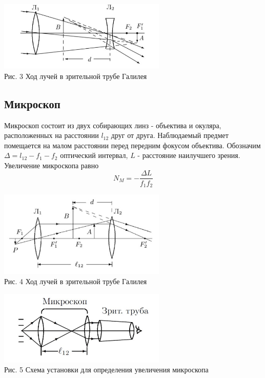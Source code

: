 \documentclass[14pt,a4paper]{scrartcl}
\begin{document}
\begin{center}
  \includegraphics[width = 8cm]{ход лучей в гал.jpg}\\
  Рис. 3 Ход лучей в зрительной трубе Галилея
 
\end{center}


\subsection{Микроскоп}
Микроскоп состоит из двух собирающих линз - объектива и окуляра, расположенных на
расстоянии $l_{12}$ друг от друга. Наблюдаемый предмет помещается на малом расстоянии
перед передним фокусом объектива. Обозначим $\Delta=l_{12}-f_{1}-f_{2}$ оптический интервал, $L$ - расстояние наилучшего зрения. Увеличение микроскопа равно
$$
N_{M}=-\frac{\Delta L}{f_{1} f_{2}}
$$


\begin{center}
  \includegraphics[width = 8cm]{ход лучей в микроскопе.jpg}\\
  Рис. 4 Ход лучей в зрительной трубе Галилея
 
\end{center}


\begin{center}
  \includegraphics[width = 8cm]{Схема установки для определения увеличения микроскопа.jpg}\\
  Рис. 5 Схема установки для определения увеличения микроскопа
 
\end{center}
\end{document}
